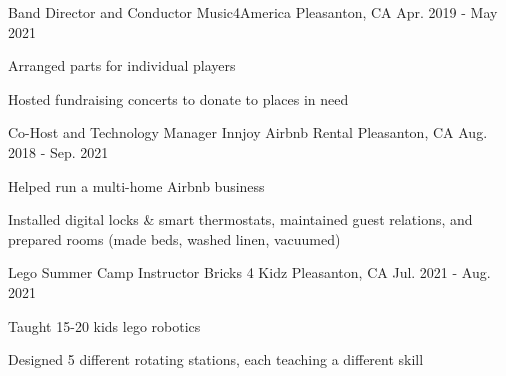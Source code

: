 


\begin{cventries}


\cventry
{Band Director and Conductor} %
{Music4America} %
{Pleasanton, CA} %
{Apr. 2019 - May 2021} %
{ %
\begin{cvitems}
\item {Arranged parts for individual players}
\item {Hosted fundraising concerts to donate to places in need}
\end{cvitems}
}


\cventry
{Co-Host and Technology Manager} %
{Innjoy Airbnb Rental} %
{Pleasanton, CA} %
{Aug. 2018 - Sep. 2021} %
{ %
\begin{cvitems}
\item {Helped run a multi-home Airbnb business}
\item {Installed digital locks \& smart thermostats, maintained guest relations, and prepared rooms (made beds, washed linen, vacuumed)}
\end{cvitems} 
}



\cventry
{Lego Summer Camp Instructor} %
{Bricks 4 Kidz} %
{Pleasanton, CA} %
{Jul. 2021 - Aug. 2021} %
{ %
\begin{cvitems}
\item {Taught 15-20 kids lego robotics}
\item {Designed 5 different rotating stations, each teaching a different skill}
\end{cvitems}
}







\end{cventries}